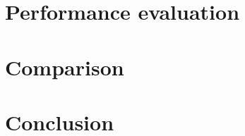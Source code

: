 \documentclass[a4paper,kul]{kulakarticle} %
\begin{document}
\section{Performance evaluation}


\section{Comparison }


\section{Conclusion}
\end{document}
